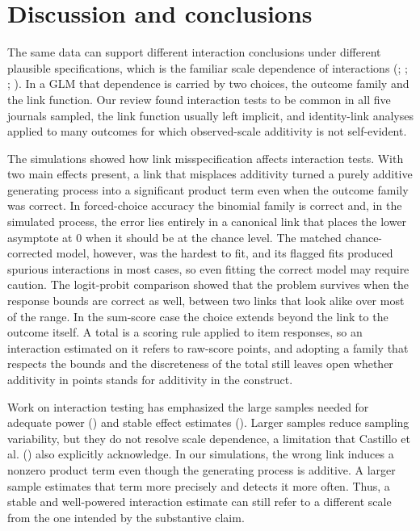 \documentclass[
  man,
  floatsintext,
  longtable,
  nolmodern,
  notxfonts,
  notimes,
  colorlinks=true,linkcolor=blue,citecolor=blue,urlcolor=blue]{apa7}
\begin{document}
\FloatBarrier

\section{Discussion and conclusions}\label{discussion-and-conclusions}

The same data can support different interaction conclusions under
different plausible specifications, which is the familiar scale
dependence of interactions (;
;
;
). In a GLM that
dependence is carried by two choices, the outcome family and the link
function. Our review found interaction tests to be common in all five
journals sampled, the link function usually left implicit, and
identity-link analyses applied to many outcomes for which observed-scale
additivity is not self-evident.

The simulations showed how link misspecification affects interaction
tests. With two main effects present, a link that misplaces additivity
turned a purely additive generating process into a significant product
term even when the outcome family was correct. In forced-choice accuracy
the binomial family is correct and, in the simulated process, the error
lies entirely in a canonical link that places the lower asymptote at 0
when it should be at the chance level. The matched chance-corrected
model, however, was the hardest to fit, and its flagged fits produced
spurious interactions in most cases, so even fitting the correct model
may require caution. The logit-probit comparison showed that the problem
survives when the response bounds are correct as well, between two links
that look alike over most of the range. In the sum-score case the choice
extends beyond the link to the outcome itself. A total is a scoring rule
applied to item responses, so an interaction estimated on it refers to
raw-score points, and adopting a family that respects the bounds and the
discreteness of the total still leaves open whether additivity in points
stands for additivity in the construct.

Work on interaction testing has emphasized the large samples needed for
adequate power () and
stable effect estimates (). Larger samples reduce sampling variability, but they do not
resolve scale dependence, a limitation that Castillo et al.
() also explicitly acknowledge. In our
simulations, the wrong link induces a nonzero product term even though
the generating process is additive. A larger sample estimates that term
more precisely and detects it more often. Thus, a stable and
well-powered interaction estimate can still refer to a different scale
from the one intended by the substantive claim.
\end{document}

